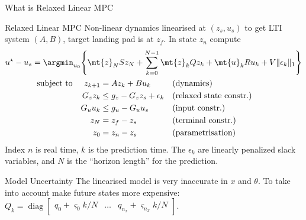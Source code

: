 \documentclass[xetex, smaller, aspectratio=43]{beamer}
\begin{document}
\appendix


\begin{frame}{What is Relaxed Linear MPC}
  \begin{block}{Relaxed Linear MPC} \small
    Non-linear dynamics linearised at $(z_s, u_s)$ to get LTI system $(A, B)$,
    target landing pad is at $z_f$. In state $z_n$ compute
    \begin{align*}
      u^\star - u_s = \argmin_{u_0} &\Bigg\{
        \mt{z}_N S z_N + \sum_{k=0}^{N-1}
          \mt{z}_k Q z_k + \mt{u}_k R u_k + V \|\epsilon_k\|_1 
        \Bigg\} \\
      \text{subject to}\quad & 
        \begin{aligned}[t]
          z_{k+1} &= A z_k + B u_k  && \text{(dynamics)} \\
          G_z z_k &\leq g_z - G_z z_s + \epsilon_k && \text{(relaxed state constr.)} \\
          G_u u_k &\leq g_u - G_u u_s && \text{(input constr.)}\\
          z_N &= z_f - z_s && \text{(terminal constr.)} \\
          z_0 &= z_n - z_s && \text{(parametrisation)}
        \end{aligned}
    \end{align*}
    Index $n$ is real time, $k$ is the prediction time. The $\epsilon_k$ are
    linearly penalized slack variables, and $N$ is the ``horizon length'' for
    the prediction.
  \end{block}

  \begin{alertblock}{Model Uncertainty} \small
    The linearised model is very inaccurate in $x$ and $\theta$. To take
    into account make future states more expensive:
    \(
      Q_k = \operatorname{diag} \begin{bmatrix}
        q_0 + \varsigma_0 k/N & \dots
        & q_{n_x} + \varsigma_{n_x} k/N
      \end{bmatrix}.
    \)
  \end{alertblock}
\end{frame}
\end{document}
